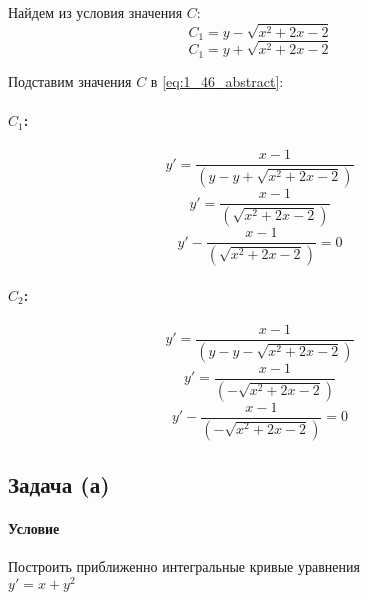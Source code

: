 Найдем из условия значения $C$:
\[C_1 = y - \sqrt{x^2 + 2x - 2}\]
\[C_1 = y + \sqrt{x^2 + 2x - 2}\]

Подставим значения $C$ в \ref{eq:1_46_abstract}:
\paragraph{$C_1$:}
\[y' = \frac{x - 1}{(y - y + \sqrt{x^2 + 2x - 2})}\]
\[y' = \frac{x - 1}{(\sqrt{x^2 + 2x - 2})}\]
\[y' - \frac{x - 1}{(\sqrt{x^2 + 2x - 2})} = 0\]

\paragraph{$C_2$:}
\[y' = \frac{x - 1}{(y - y - \sqrt{x^2 + 2x - 2})}\]
\[y' = \frac{x - 1}{(- \sqrt{x^2 + 2x - 2})}\]
\[y' - \frac{x - 1}{(- \sqrt{x^2 + 2x - 2})} = 0\]

\newpage
\subsection{Задача (а)}
\paragraph{Условие}
Построить приближенно интегральные кривые уравнения\\ $y' = x + y^2$

\vspace{5mm}
